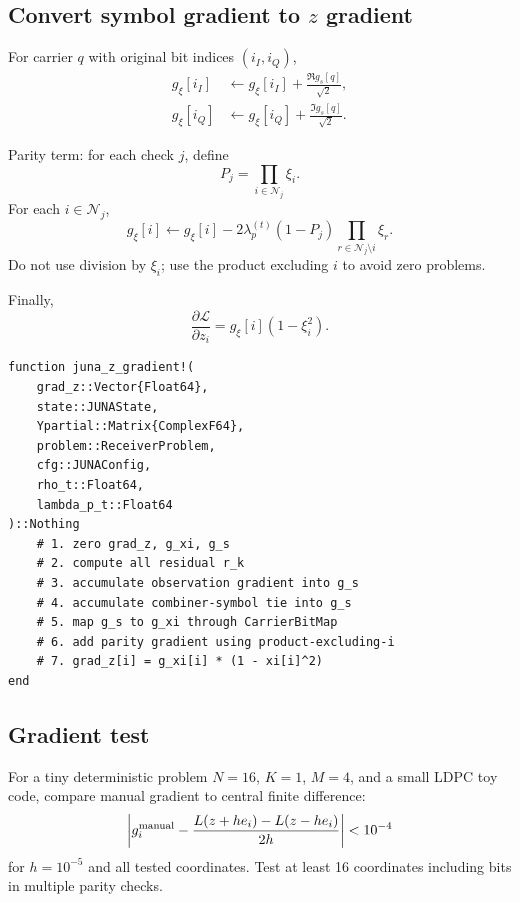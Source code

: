 \documentclass[11pt]{article}
\begin{document}
\subsection{Convert symbol gradient to $z$ gradient}

For carrier $q$ with original bit indices $(i_I,i_Q)$,
\begin{align}
g_\xi[i_I]&\leftarrow g_\xi[i_I]+\frac{\Re g_s[q]}{\sqrt2},\\
g_\xi[i_Q]&\leftarrow g_\xi[i_Q]+\frac{\Im g_s[q]}{\sqrt2}.
\end{align}

Parity term: for each check $j$, define
\begin{equation}
P_j=\prod_{i\in\mathcal N_j}\xi_i.
\end{equation}
For each $i\in\mathcal N_j$,
\begin{equation}
g_\xi[i]\leftarrow g_\xi[i]-2\lambda_p^{(t)}(1-P_j)
\prod_{r\in\mathcal N_j\setminus i}\xi_r.
\end{equation}
Do not use division by $\xi_i$; use the product excluding $i$ to avoid zero problems.

Finally,
\begin{equation}
\frac{\partial\mathcal L}{\partial z_i}=g_\xi[i](1-\xi_i^2).
\end{equation}

\begin{lstlisting}
function juna_z_gradient!(
    grad_z::Vector{Float64},
    state::JUNAState,
    Ypartial::Matrix{ComplexF64},
    problem::ReceiverProblem,
    cfg::JUNAConfig,
    rho_t::Float64,
    lambda_p_t::Float64
)::Nothing
    # 1. zero grad_z, g_xi, g_s
    # 2. compute all residual r_k
    # 3. accumulate observation gradient into g_s
    # 4. accumulate combiner-symbol tie into g_s
    # 5. map g_s to g_xi through CarrierBitMap
    # 6. add parity gradient using product-excluding-i
    # 7. grad_z[i] = g_xi[i] * (1 - xi[i]^2)
end
\end{lstlisting}

\subsection{Gradient test}

For a tiny deterministic problem $N=16$, $K=1$, $M=4$, and a small LDPC toy code, compare manual gradient to central finite difference:
\begin{equation}
\left|g_i^{\rm manual}-\frac{L(z+h e_i)-L(z-h e_i)}{2h}\right|<10^{-4}
\end{equation}
for $h=10^{-5}$ and all tested coordinates. Test at least 16 coordinates including bits in multiple parity checks.
\end{document}
